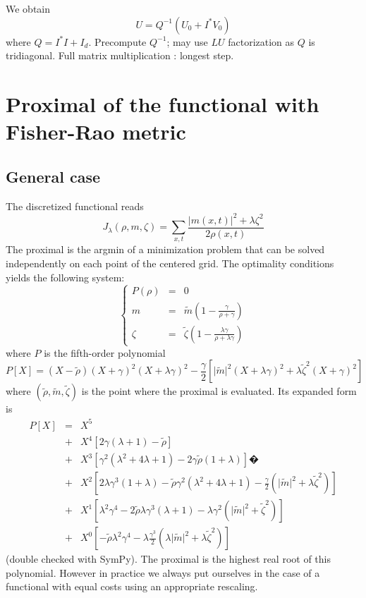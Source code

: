 \documentclass[13pt,aps,prb,preprint]{article}
\begin{document}
We obtain
$$U=Q^{-1}(U_0+I^*V_0)$$
where $Q=I^*I+I_d$. Precompute $Q^{-1}$; may use $LU$ factorization as $Q$ is tridiagonal.
Full matrix multiplication : longest step.


\section{Proximal of the functional with Fisher-Rao metric}

\subsection{General case}
The discretized functional reads
$$  J_{\lambda} (\rho,m,\zeta) = \sum_{x,t} \frac{\vert m(x,t) \vert^2+ \lambda \zeta^2 }{2\rho(x,t)}$$
The proximal is the argmin of a minimization problem that can be solved independently on each point of the centered grid. The optimality conditions yields the following system:
\begin{equation}
\left\{
\begin{array}{ccc}
P( \rho ) & = & 0 \\
m         & = & \tilde{m} \left(  1 - \frac{\gamma}{\rho + \gamma} \right) \\
\zeta       & = & \tilde{\zeta} \left(  1 -  \frac{\lambda \gamma}{\rho + \lambda \gamma} \right)
\end{array}
\right.
\end{equation}
where $P$ is the fifth-order polynomial
$$ P[X] = (X-\tilde{\rho})(X+\gamma)^2(X+\lambda \gamma)^2 -\frac{\gamma}{2} \left[  \vert \tilde{m} \vert^2 (X +\lambda \gamma )^2 + \lambda \tilde{\zeta}^2 (X+\gamma)^2 \right] $$
where $(\tilde{\rho},\tilde{m},\tilde{\zeta})$ is the point where the proximal is evaluated. Its expanded form is
\begin{eqnarray*}
P[X] & = & X^5 \\
	& + & X^4 \left[  2\gamma (\lambda+1) -\tilde{\rho} \right] \\
	& + & X^3 \left[  \gamma^2 (\lambda^2 +4\lambda +1) -2\gamma \tilde{\rho} (1+ \lambda)\right]�\\
	& + & X^2 \left[  2\lambda \gamma^3 (1+\lambda) -\tilde{\rho} \gamma^2 (\lambda^2 +4\lambda +1)
	-\frac{\gamma}{2}(\vert \tilde{m} \vert^2 +\lambda \tilde{\zeta}^2)   \right] \\
	& + & X^1 \left[  \lambda^2 \gamma^4 -2\tilde{\rho} \lambda \gamma^3 (\lambda+1)
	- \lambda \gamma^2(\vert \tilde{m} \vert^2 +\tilde{\zeta}^2) \right] \\
	& + & X^0 \left[ -\tilde{\rho} \lambda^2 \gamma^4 -\lambda \frac{\gamma^3}{2} (\lambda \vert \tilde{m} \vert^2 +\lambda \tilde{\zeta}^2)  \right]
\end{eqnarray*}
(double checked with SymPy). The proximal is the highest real root of this polynomial. However in practice we always put ourselves in the case of a functional with equal costs using an appropriate rescaling.
\end{document}
